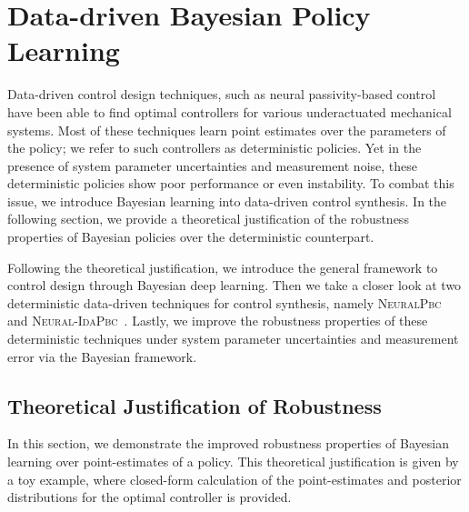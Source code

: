 \chapter{Data-driven Bayesian Policy Learning}
\label{ch:method}

Data-driven control design techniques, such as neural passivity-based
control~\cite{neuralpbc} have been able to find optimal controllers for various
underactuated mechanical systems. Most of these techniques learn point estimates
over the parameters of the policy; we refer to such controllers as deterministic
policies.  
%
Yet in the presence of system parameter uncertainties and measurement noise,
these deterministic policies show poor performance or even instability. To
combat this issue, we introduce Bayesian learning into data-driven control
synthesis. In the following section, we provide a theoretical justification of
the robustness properties of Bayesian policies over the deterministic
counterpart. 

Following the theoretical justification, we introduce the general framework to
control design through Bayesian deep learning. Then we take a closer look at
two deterministic data-driven techniques for control synthesis, namely
\textsc{NeuralPbc}~\cite{neuralpbc} and
\textsc{Neural-IdaPbc}~\cite{neuralidapbc}. Lastly, we improve the robustness
properties of these deterministic techniques under system parameter
uncertainties and measurement error via the Bayesian framework.


\section{Theoretical Justification of Robustness}
\label{sec:justification}

In this section, we demonstrate the improved robustness properties of Bayesian
learning over point-estimates of a policy. This theoretical justification is
given by a toy example, where closed-form calculation of the point-estimates and
posterior distributions for the optimal controller is provided.

